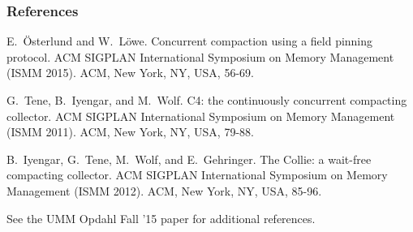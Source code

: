 \documentclass{beamer}
\newcommand{\linespace}{\vskip 0.25cm}
\begin{document}
\begin{frame} 
	\frametitle{References} 

\begin{thebibliography}{lskdjf}

E.~\"{O}sterlund and W.~L\"{o}we.
\newblock Concurrent compaction using a field pinning protocol. 
 ACM SIGPLAN International Symposium on Memory Management (ISMM 2015). ACM, New York, NY, USA, 56-69.

G.~Tene, B.~Iyengar, and M.~Wolf.
\newblock C4: the continuously concurrent compacting collector.
 ACM SIGPLAN International Symposium on Memory Management (ISMM 2011). ACM, New York, NY, USA, 79-88.

B.~Iyengar, G.~Tene, M.~Wolf, and E.~Gehringer.
\newblock The Collie: a wait-free compacting collector.
 ACM SIGPLAN International Symposium on Memory Management (ISMM 2012). ACM, New York, NY, USA, 85-96.

\linespace
\begin{center}
\color{black}See the UMM Opdahl Fall '15 paper for additional references.
\end{center}


\end{thebibliography}

\end{frame} 
\end{document}

